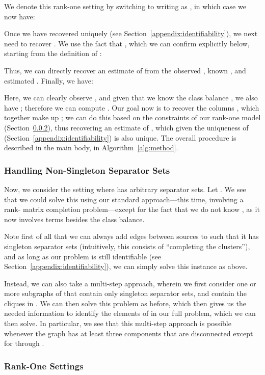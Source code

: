 \documentclass[letterpaper]{article}
\begin{document}
\begin{appendix}
We denote this rank-one setting by switching to writing  as , in which case we now have:

Once we have recovered  uniquely (see Section~\ref{appendix:identifiability}), we next need to recover .
We use the fact that , which we can confirm explicitly below, starting from the definition of :

Thus, we can directly recover an estimate of  from the observed , known , and estimated .
Finally, we have:

Here, we can clearly observe , and given that we know the class balance , we also have ; therefore we can compute .
Our goal now is to recover the columns , which together make up ; we can do this based on the constraints of our rank-one model (Section~\ref{appendix:rank-one-reduction}), thus recovering an estimate of , which given the uniqueness of  (Section~\ref{appendix:identifiability}) is also unique.
The overall procedure is described in the main body, in Algorithm~\ref{alg:method}.

\subsubsection{Handling Non-Singleton Separator Sets}
\label{appendix:non-singleton-sep-sets}

Now, we consider the setting where  has arbitrary separator sets.
Let .
We see that we could solve this using our standard approach---this time, involving a rank- matrix completion problem---except for the fact that we do not know , as it now involves terms besides the class balance.

Note first of all that we can always add edges between sources to  such that it has singleton separator sets (intuitively, this consists of ``completing the clusters''), and as long as our problem is still identifiable (see Section~\ref{appendix:identifiability}), we can simply solve this instance as above.

Instead, we can also take a multi-step approach, wherein we first consider one or more subgraphs of  that contain only singleton separator sets, and contain the cliques in .
We can then solve this problem as before, which then gives us the needed information to identify the elements of  in our full problem, which we can then solve.
In particular, we see that this multi-step approach is possible whenever the graph  has at least three components that are disconnected except for through .

\subsubsection{Rank-One Settings}
\label{appendix:rank-one-reduction}


\end{appendix}
\end{document}
